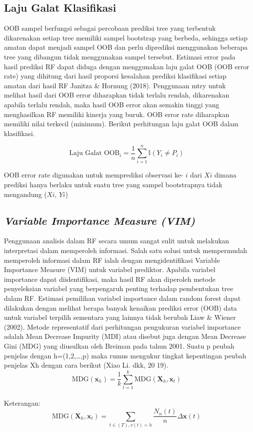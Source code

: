 \subsection{Laju Galat Klasifikasi}
OOB sampel berfungsi sebagai percobaan prediksi tree yang terbentuk dikarenakan setiap tree memiliki sampel bootstrap yang berbeda, sehingga setiap amatan dapat menjadi sampel OOB dan perlu diprediksi menggunakan beberapa tree yang dibangun tidak menggunakan sampel tersebut. Estimasi error pada hasil prediksi RF dapat diduga dengan menggunakan laju galat OOB (OOB error rate) yang dihitung dari hasil proporsi kesalahan prediksi klasifikasi setiap amatan dari hasil RF Janitza \& Hornung (2018). Penggunaan mtry untuk melihat hasil dari OOB error diharapkan tidak terlalu rendah, dikarenakan apabila terlalu rendah, maka hasil OOB error akan semakin tinggi yang menghasilkan RF memiliki kinerja yang buruk. OOB error rate diharapkan memiliki nilai terkecil (minimum). Berikut perhitungan laju galat OOB dalam klasifikasi.

\begin{equation}
    \text{Laju Galat } \text{OOB}_i = \frac{1}{n} \sum_{i=1}^{n} \mathbb{I}(Y_i \neq P_i)
    \end{equation}

OOB error rate digunakan untuk memprediksi observasi ke- $i$ dari $Xi$ dimana
prediksi hanya berlaku untuk suatu tree yang sampel bootstrapnya tidak mengandung ($Xi$, $Yi$)
    
\subsection{\textit{Variable Importance Measure (VIM)}}
Penggunaan analisis dalam RF secara umum sangat sulit untuk melakukan interpretasi dalam memperoleh informasi. Salah satu solusi untuk mempermudah memperoleh informasi dalam RF ialah dengan mengidentifikasi Variable Importance Measure (VIM) untuk variabel prediktor. Apabila variabel importance dapat diidentifikasi, maka hasil RF akan diperoleh metode penyeleksian variabel yang berpengaruh penting terhadap pembentukan tree dalam RF. Estimasi pemilihan variabel importance dalam random forest dapat dilakukan dengan melihat berapa banyak kenaikan prediksi error (OOB) data untuk variabel terpilih sementara yang lainnya tidak berubah Liaw \& Wiener (2002).
Metode representatif dari perhitungan pengukuran variabel importance adalah Mean Decrease Impurity (MDI) atau disebut juga dengan Mean Decrease Gini (MDG) yang diusulkan oleh Breiman pada tahun 2001. Suatu p peubah penjelas dengan h=(1,2,…,p) maka rumus mengukur tingkat kepentingan peubah penjelas Xh dengan cara berikut (Xiao Li. dkk, 20 19).
\begin{equation}
  \text{MDG}(\mathbf{x}_h) = \frac{1}{k} \sum_{t=1}^{k} \text{MDG}(\mathbf{X}_h, \mathbf{x}_t)
  \end{equation}
\\
Keterangan:
\begin{equation}
  \text{MDG}(\mathbf{X}_h, \mathbf{x}_t) = \sum_{t \in (T), v(t) = h} \frac{N_n(t)}{n} \Delta\mathbf{x}(t)
  \end{equation}

